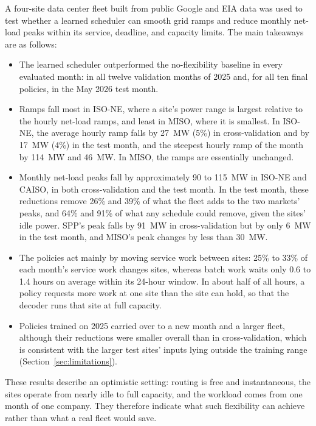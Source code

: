 \documentclass{UNCC-thesis}
\begin{document}
A four-site data center fleet built from public Google and EIA data was used to test whether a
learned scheduler can smooth grid ramps and reduce monthly net-load peaks within its service,
deadline, and capacity limits. The main takeaways are as follows:
\begin{itemize}
  \item The learned scheduler outperformed the no-flexibility baseline in every evaluated month:
        in all twelve validation months of 2025 and, for all ten final policies, in the May 2026
        test month.
  \item Ramps fall most in ISO-NE, where a site's power range is largest relative to the hourly
        net-load ramps, and least in MISO, where it is smallest. In ISO-NE, the average hourly ramp
        falls by 27~MW (5\%) in cross-validation and by 17~MW (4\%) in the test month, and the
        steepest hourly ramp of the month by 114~MW and 46~MW. In MISO, the ramps are essentially
        unchanged.
  \item Monthly net-load peaks fall by approximately 90 to 115~MW in ISO-NE and CAISO, in both
        cross-validation and the test month. In the test month, these reductions remove 26\% and
        39\% of what the fleet adds to the two markets' peaks, and 64\% and 91\% of what any
        schedule could remove, given the sites' idle power. SPP's peak falls by 91~MW in
        cross-validation but by only 6~MW in the test month, and MISO's peak changes by less than
        30~MW.
  \item The policies act mainly by moving service work between sites: 25\% to 33\% of each
        month's service work changes sites, whereas batch work waits only 0.6 to 1.4 hours on
        average within its 24-hour window. In about half of all hours, a policy requests more work
        at one site than the site can hold, so that the decoder runs that site at full capacity.
  \item Policies trained on 2025 carried over to a new month and a larger fleet, although their
        reductions were smaller overall than in cross-validation, which is consistent with the
        larger test sites' inputs lying outside the training range
        (Section~\ref{sec:limitations}).
\end{itemize}
These results describe an optimistic setting: routing is free and instantaneous, the sites operate
from nearly idle to full capacity, and the workload comes from one month of one company. They
therefore indicate what such flexibility can achieve rather than what a real fleet would save.
\end{document}
